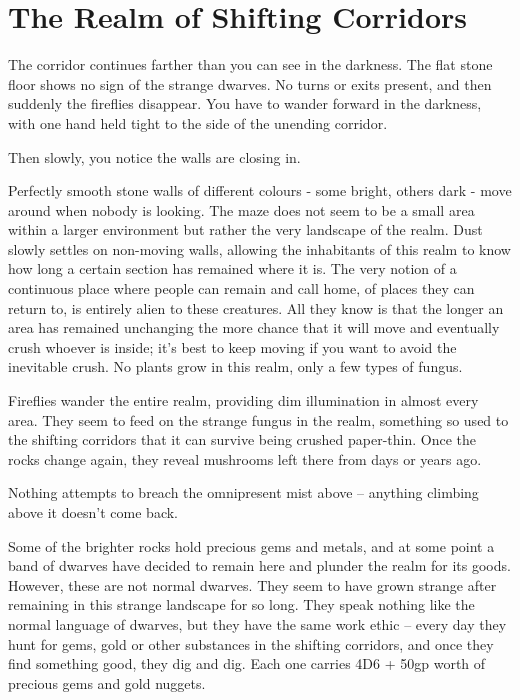 \section{The Realm of Shifting Corridors}

\begin{multicols}{2}

\begin{boxtext}
	The corridor continues farther than you can see in the darkness.  The flat stone floor shows no sign of the strange dwarves.  No turns or exits present, and then suddenly the fireflies disappear.  You have to wander forward in the darkness, with one hand held tight to the side of the unending corridor.

	Then slowly, you notice the walls are closing in.

\end{boxtext}

Perfectly smooth stone walls of different colours - some bright, others dark - move around when nobody is looking.  The maze does not seem to be a small area within a larger environment but rather the very landscape of the realm.  Dust slowly settles on non-moving walls, allowing the inhabitants of this realm to know how long a certain section has remained where it is.  The very notion of a continuous place where people can remain and call home, of places they can return to, is entirely alien to these creatures.  All they know is that the longer an area has remained unchanging the more chance that it will move and eventually crush whoever is inside; it's best to keep moving if you want to avoid the inevitable crush.  No plants grow in this realm, only a few types of fungus.

Fireflies wander the entire realm, providing dim illumination in almost every area.  They seem to feed on the strange fungus in the realm, something so used to the shifting corridors that it can survive being crushed paper-thin.  Once the rocks change again, they reveal mushrooms left there from days or years ago.

Nothing attempts to breach the omnipresent mist above -- anything climbing above it doesn't come back.

Some of the brighter rocks hold precious gems and metals, and at some point a band of dwarves have decided to remain here and plunder the realm for its goods.  However, these are not normal dwarves.  They seem to have grown strange after remaining in this strange landscape for so long.  They speak nothing like the normal language of dwarves, but they have the same work ethic -- every day they hunt for gems, gold or other substances in the shifting corridors, and once they find something good, they dig and dig.  Each one carries 4D6 + 50gp worth of precious gems and gold nuggets.


\end{multicols}
